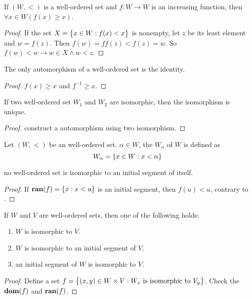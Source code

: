 \begin{theorem}\label{wellorderedsetisomorphismisbigger}
    If $(W,<)$ is a well-ordered set and $f:W \rightarrow W$ is an increasing function, then $\forall x\in W \left( f(x) \geq x \right)$.
\end{theorem}
\begin{proof}
    If the set $X = \set{x \in W: f(x) < x}$ is nonempty, let $z$ be its least element and $w = f(z)$. Then $f(w) = ff(z) < f(z) = w $. So $f(w) < w \rightarrow w \in X \wedge w < z$.
\end{proof}

\begin{theorem}
    The only automorphism of a well-ordered set is the identity.    
\end{theorem}
\begin{proof}
    $f(x) \geq x$ and $f^{-1} \geq x$.
\end{proof}


\begin{theorem}
    If two well-ordered set $W_1$ and $W_2$ are isomorphic, then the isomorphism is unique.
\end{theorem}
\begin{proof}
    construct a automorphism using two isomorphism.
\end{proof}

\begin{definition}
    Let $(W,<)$ be an well-ordered set. $\alpha \in W$, the  $W_\alpha$ of $W$ is defined as
    \begin{equation}
        W_\alpha = \set{x \in W: x < \alpha}
    \end{equation}
\end{definition}

\begin{theorem}
    no well-ordered set is isomorphic to an initial segment of itself.    
\end{theorem}
\begin{proof}
    If $\mathbf{ran}(f) = \set{x: x < u}$ is an initial segment, then $f(u) < u$, contrary to .
\end{proof}

\begin{theorem}
    If $W$ and $V$ are well-ordered sets, then one of the following holds:
    \begin{enumerate}
        \item $W$ is isomorphic to $V$.
        \item $W$ is isomorphic to an initial segment of $V$.
        \item an initial segment of $W$ is isomorphic to $V$.
    \end{enumerate}    
\end{theorem}
\begin{proof}
    Define a set $f = \set{(x,y)\in W \times V: W_x \text{ is isomorphic to } V_y}$. Check the $\mathbf{dom}(f)$ and $\mathbf{ran}(f)$.
\end{proof}





